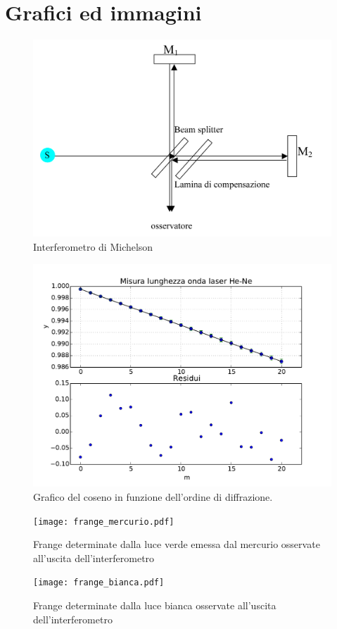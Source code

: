 \section{Grafici ed immagini}
\begin{figure}[h]
	\centering
	\includegraphics[scale=0.5]{Ottica 2B Interferometro di Michelson-1.png}
	\caption{Interferometro di Michelson}
	\label{f:figura_1}
\end{figure}
\begin{figure}[h]
	\centering
	\includegraphics[scale=0.5]{grafico.pdf}
	\caption{Grafico del coseno in funzione dell'ordine di diffrazione.}
           \label{f:figura_2}
\end{figure}

\begin{figure}[h]
	\centering
	\texttt{[image: frange\_mercurio.pdf]}
	\caption{Frange determinate dalla luce verde emessa dal mercurio osservate all'uscita dell'interferometro}
           \label{f:frange_mercurio}
\end{figure}

\begin{figure}[h]
	\centering
	\texttt{[image: frange\_bianca.pdf]}
	\caption{Frange determinate dalla luce bianca osservate all'uscita dell'interferometro}
           \label{f:frange_bianca}
\end{figure}
